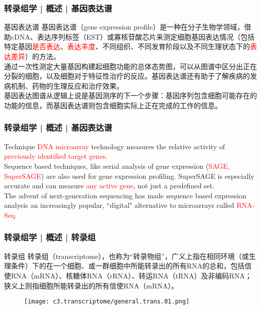 \begin{frame}
  \frametitle{转录组学 | 概述 | 基因表达谱}
  \begin{block}{基因表达谱}
    基因表达谱（gene expression profile）是一种在分子生物学领域，借助cDNA、表达序列标签（EST）或寡核苷酸芯片来测定细胞基因表达情况（包括特定基因\textcolor{red}{是否表达}、\textcolor{red}{表达丰度}、不同组织、不同发育阶段以及不同生理状态下的\textcolor{red}{表达差异}）的方法。\\
\vspace{1em}
通过一次性测定大量基因构建起细胞功能的总体态势图，可以从图谱中区分出正在分裂的细胞，以及细胞对于特征性治疗的反应。基因表达谱还有助于了解疾病的发病机制、药物的生理反应和治疗效果。\\
\vspace{1em}
基因表达图谱从逻辑上说是基因测序的下一个步骤：基因序列包含细胞可能存在的功能的信息，而基因表达谱则包含细胞实际上正在完成的工作的信息。
  \end{block}
\end{frame}

\begin{frame}
  \frametitle{转录组学 | 概述 | 基因表达谱}
  \begin{block}{Technique}
    \textcolor{red}{DNA microarray} technology measures the relative activity of \textcolor{red}{previously identified target genes}.\\
    \vspace{1em}
    Sequence based techniques, like serial analysis of gene expression (\textcolor{red}{SAGE, SuperSAGE}) are also used for gene expression profiling. SuperSAGE is especially accurate and can measure \textcolor{red}{any active gene}, not just a predefined set.\\
 \vspace{1em}
 The advent of next-generation sequencing has made sequence based expression analysis an increasingly popular, ``digital" alternative to microarrays called \textcolor{red}{RNA-Seq}. 
  \end{block}
\end{frame}

\begin{frame}
  \frametitle{转录组学 | 概述 | 转录组}
  \begin{block}{转录组}
转录组（transcriptome），也称为“转录物组”，广义上指在相同环境（或生理条件）下的在一个细胞、或一群细胞中所能转录出的所有RNA的总和，包括信使RNA（mRNA）、核糖体RNA（rRNA）、转运RNA（tRNA）及非编码RNA；狭义上则指细胞所能转录出的所有信使RNA（mRNA）。
  \end{block}
  \begin{figure}
    \centering
    \texttt{[image: c3.transcriptome/general.trans.01.png]}
  \end{figure}
\end{frame}

